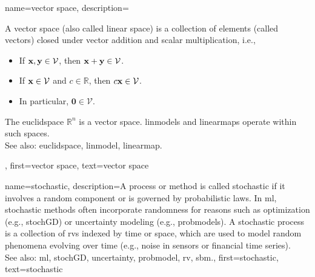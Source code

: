 

{name={vector space},
	description={A vector space (also called linear space) is a collection of elements (called vectors) closed under vector addition and scalar multiplication, i.e.,
		\begin{itemize}
			\item If ${\bf x}, {\bf y} \in \mathcal{V}$, then ${\bf x} + {\bf y} \in \mathcal{V}$.
			\item If ${\bf x} \in \mathcal{V}$ and $c \in \mathbb{R}$, then $c {\bf x} \in \mathcal{V}$.
			\item In particular, $\mathbf{0} \in \mathcal{V}$.
		\end{itemize}
		The \gls{euclidspace} $\mathbb{R}^n$ is a vector space.
		\Glspl{linmodel} and \glspl{linearmap} operate within such spaces.\\
		See also: \gls{euclidspace}, \gls{linmodel}, \gls{linearmap}.},
	first={vector space},
	text={vector space}
}


{name={stochastic},
	description={A process or method is called stochastic if it involves
		a random component or is governed by probabilistic laws. In \gls{ml}, stochastic
		methods often incorporate randomness for reasons such as optimization (e.g., \gls{stochGD})
		or \gls{uncertainty} modeling (e.g., \glspl{probmodel}). A stochastic process is a collection
		of \glspl{rv} indexed by time or space, which are used to model random phenomena
		evolving over time (e.g., noise in sensors or financial time series).\\
		See also:  \gls{ml}, \gls{stochGD}, \gls{uncertainty}, \gls{probmodel}, \gls{rv}, \gls{sbm}.},
	first={stochastic},
	text={stochastic}
}

